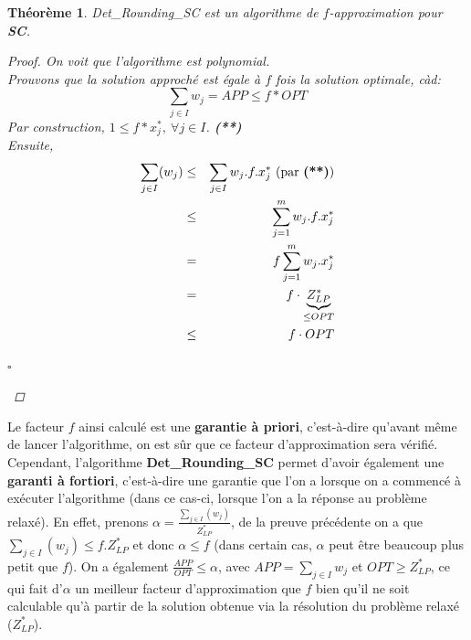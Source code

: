 \documentclass[12pt]{article}
\newcommand{\titre}[1]{\textcolor{title}{#1}}
\newcommand{\cqfd}{\begin{flushright}$\square$\end{flushright}}
\newtheorem{thm}{Th\'eor\`eme}[section]
\newtheorem{proof}{Preuve}[section]
\begin{document}
\begin{thm} Det\_Rounding\_SC est un algorithme de $f$-\textit{approximation}
pour \textbf{\titre{SC}}.
\begin{proof}
On voit que l'algorithme est polynomial.\\
Prouvons que la solution approché est égale à $f$ fois la solution optimale,
càd:
$$ \sum_{j\in I} w_j = APP \leq f * OPT  $$
Par construction, $1 \leq f*x^*_j,\ \forall j \in I$. \textbf{(**)}\\
Ensuite,
\begin{eqnarray}
\sum_{j\in I} (w_j)%
				    & \leq & \sum_{j \in I} w_j . f . x^*_j
                    \text{ (par \textbf{(**)})} \\
				    & \leq & \sum_{j = 1}^m w_j . f . x^*_j \\
				    &   =  & f \sum_{j=1}^m w_j . x^*_j \\
					&   =  & f \cdot \underbrace{Z_{LP}^*}_{\leq OPT} \\
					& \leq & f \cdot OPT
\end{eqnarray}
\cqfd
\end{proof}
\end{thm}

Le facteur $f$ ainsi calculé est une \textbf{garantie à priori}, c'est-à-dire
qu'avant même de lancer l'algorithme, on est sûr que ce facteur d'approximation
sera vérifié. Cependant, l'algorithme \textbf{Det\_Rounding\_SC} permet d'avoir
également une \textbf{garanti à fortiori}, c'est-à-dire une garantie que l'on a
lorsque on a commencé à exécuter l'algorithme (dans ce cas-ci, lorsque l'on a
la réponse au problème relaxé). En effet, prenons
$\alpha = \frac{\sum_{j\in I}(w_j)}{Z^*_{LP}}$, de la preuve précédente on a que
$\sum_{j\in I}(w_j) \leq f.Z^*_{LP}$ et donc $\alpha \leq f$ (dans certain cas,
$\alpha$ peut être beaucoup plus petit que $f$). On a également
$\frac{APP}{OPT}\leq \alpha$, avec $APP = \sum_{j \in I} w_j$ et $OPT \geq Z^*_{LP}$, ce qui fait d'$\alpha$ un meilleur facteur
d'approximation que $f$ bien qu'il ne soit calculable qu'à partir de la solution
obtenue via la résolution du problème relaxé ($Z^*_{LP}$).

\vspace{4em}
\end{document}
